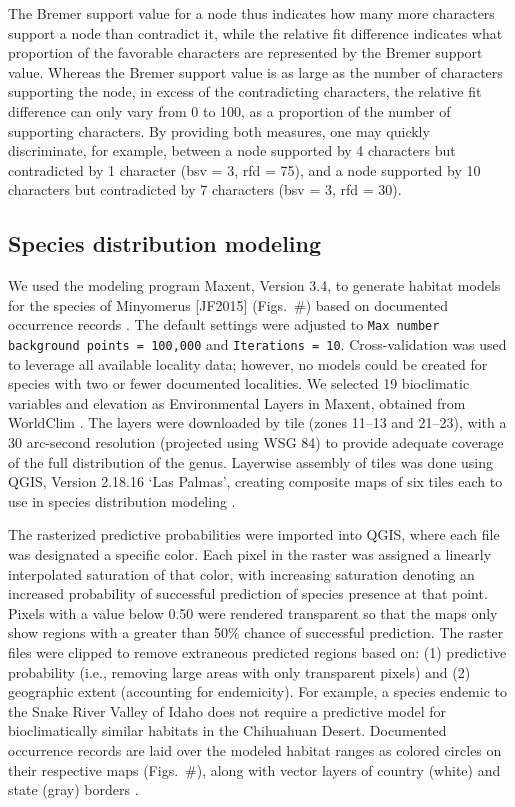 \documentclass[fleqn,10pt,lineno]{wlpeerj} %
\begin{document}
		The Bremer support value for a node thus indicates how many more characters support a node than contradict it, while the relative fit difference indicates what proportion of the favorable characters are represented by the Bremer support value.
		Whereas the Bremer support value is as large as the number of characters supporting the node, in excess of the contradicting characters, the relative fit difference can only vary from 0 to 100, as a proportion of the number of supporting characters.
		By providing both measures, one may quickly discriminate, for example, between a node supported by 4 characters but contradicted by 1 character (bsv = 3, rfd = 75), and a node supported by 10 characters but contradicted by 7 characters (bsv = 3, rfd = 30).
	
	\subsection*{Species distribution modeling}
		We used the modeling program Maxent, Version 3.4, to generate habitat models for the species of Minyomerus [JF2015] (Figs.~\#) based on documented occurrence records \citep{phillips2004, phillips2006, elith2011}.
		The default settings were adjusted to \texttt{Max number background points = 100,000} and \texttt{Iterations = 10}.
		Cross-validation was used to leverage all available locality data; however, no models could be created for species with two or fewer documented localities.
		We selected 19 bioclimatic variables and elevation as Environmental Layers in Maxent, obtained from WorldClim \citep{hijmans2005}.
		The layers were downloaded by tile (zones 11–13 and 21–23), with a 30 arc-second resolution (projected using WSG 84) to provide adequate coverage of the full distribution of the genus.
		Layerwise assembly of tiles was done using QGIS, Version 2.18.16 `Las Palmas', creating composite maps of six tiles each to use in species distribution modeling \citep{qgis2018}.
		
		The rasterized predictive probabilities were imported into QGIS, where each file was designated a specific color. 
		Each pixel in the raster was assigned a linearly interpolated saturation of that color, with increasing saturation denoting an increased probability of successful prediction of species presence at that point.
		Pixels with a value below 0.50 were rendered transparent so that the maps only show regions with a greater than 50\% chance of successful prediction.
		The raster files were clipped to remove extraneous predicted regions based on: (1) predictive probability (i.e., removing large areas with only transparent pixels) and (2) geographic extent (accounting for endemicity).
		For example, a species endemic to the Snake River Valley of Idaho does not require a predictive model for bioclimatically similar habitats in the Chihuahuan Desert.
		Documented occurrence records are laid over the modeled habitat ranges as colored circles on their respective maps (Figs.~\#), along with vector layers of country (white) and state (gray) borders \citep{hijmans2012}.
		
\end{document}
